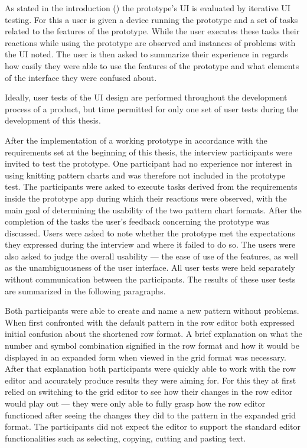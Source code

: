 As stated in the introduction () the prototype's \gls{UI} is evaluated by iterative \gls{UI} testing. For this a user is given a device running the prototype and a set of tasks related to the features of the prototype. While the user executes these tasks their reactions while using the prototype are observed and instances of problems with the \gls{UI} noted. The user is then asked to summarize their experience in regards how easily they were able to use the features of the prototype and what elements of the interface they were confused about.

Ideally, user tests of the \gls{UI} design are performed throughout the development process of a product, but time permitted for only one set of user tests during the development of this thesis.

After the implementation of a working prototype in accordance with the requirements set at the beginning of this thesis, the interview participants were invited to test the prototype. One participant had no experience nor interest in using knitting pattern charts and was therefore not included in the prototype test.
The participants were asked to execute tasks derived from the requirements inside the prototype app during which their reactions were observed, with the main goal of determining the usability of the two pattern chart formats. After the completion of the tasks the user's feedback concerning the prototype was discussed. Users were asked to note whether the prototype met the expectations they expressed during the interview and where it failed to do so. The users were also asked to judge the overall usability --- the ease of use of the features, as well as the unambiguousness of the user interface. All user tests were held separately without communication between the participants. The results of these user tests are summarized in the following paragraphs.

Both participants were able to create and name a new pattern without problems. When first confronted with the default pattern in the row editor both expressed initial confusion about the shortened row format. A brief explanation on what the number and symbol combination signified in the row format and how it would be displayed in an expanded form when viewed in the grid format was necessary. After that explanation both participants were quickly able to work with the row editor and accurately produce results they were aiming for. For this they at first relied on switching to the grid editor to see how their changes in the row editor would play out --- they were only able to fully grasp how the row editor functioned after seeing the changes they did to the pattern in the expanded grid format. The participants did not expect the editor to support the standard editor functionalities such as selecting, copying, cutting and pasting text. 

